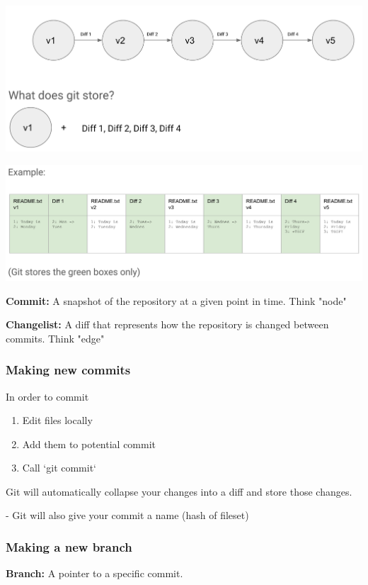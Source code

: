 \documentclass{article}
\begin{document}
\includegraphics*[width=\linewidth]{gitDiff.png}

\includegraphics*[width=\linewidth]{gitDIffEx.png}

\textbf{Commit:} A snapshot of the repository at a given point in time. Think "node"

\textbf{Changelist: } A diff that represents how the repository is changed between commits. Think "edge"

\subsubsection{Making new commits}

In order to commit
\begin{enumerate}
    \item Edit files locally
    \item Add them to potential commit
    \item Call `git commit`
\end{enumerate}

Git will automatically collapse your changes into a diff and store those changes. \par
- Git will also give your commit a name (hash of fileset)

\subsubsection{Making a new branch}

\textbf{Branch: } A pointer to a specific commit.
\end{document}
